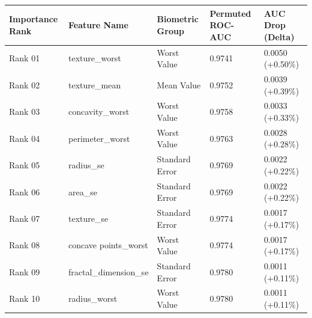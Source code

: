 \begin{tabular}{lllll}
\toprule
Importance Rank & Feature Name & Biometric Group & Permuted ROC-AUC & AUC Drop (Delta) \\
\midrule
Rank 01 & texture\_worst & Worst Value & 0.9741 & 0.0050 (+0.50\%) \\
Rank 02 & texture\_mean & Mean Value & 0.9752 & 0.0039 (+0.39\%) \\
Rank 03 & concavity\_worst & Worst Value & 0.9758 & 0.0033 (+0.33\%) \\
Rank 04 & perimeter\_worst & Worst Value & 0.9763 & 0.0028 (+0.28\%) \\
Rank 05 & radius\_se & Standard Error & 0.9769 & 0.0022 (+0.22\%) \\
Rank 06 & area\_se & Standard Error & 0.9769 & 0.0022 (+0.22\%) \\
Rank 07 & texture\_se & Standard Error & 0.9774 & 0.0017 (+0.17\%) \\
Rank 08 & concave points\_worst & Worst Value & 0.9774 & 0.0017 (+0.17\%) \\
Rank 09 & fractal\_dimension\_se & Standard Error & 0.9780 & 0.0011 (+0.11\%) \\
Rank 10 & radius\_worst & Worst Value & 0.9780 & 0.0011 (+0.11\%) \\
\bottomrule
\end{tabular}
